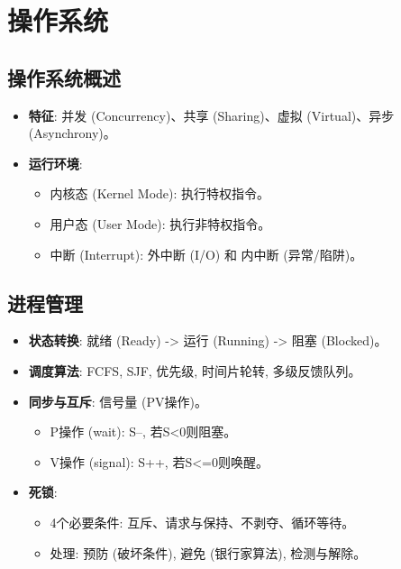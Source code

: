 \documentclass[cn,hazy,blue,12pt,screen,normal]{elegantnote}
\begin{document}
\section{操作系统}

\subsection{操作系统概述}
\begin{itemize}
    \item \textbf{特征}: 并发 (Concurrency)、共享 (Sharing)、虚拟 (Virtual)、异步 (Asynchrony)。
    \item \textbf{运行环境}:
    \begin{itemize}
        \item 内核态 (Kernel Mode): 执行特权指令。
        \item 用户态 (User Mode): 执行非特权指令。
        \item 中断 (Interrupt): 外中断 (I/O) 和 内中断 (异常/陷阱)。
    \end{itemize}
\end{itemize}

\subsection{进程管理}
\begin{itemize}
    \item \textbf{状态转换}: 就绪 (Ready) -> 运行 (Running) -> 阻塞 (Blocked)。
    \item \textbf{调度算法}: FCFS, SJF, 优先级, 时间片轮转, 多级反馈队列。
    \item \textbf{同步与互斥}: 信号量 (PV操作)。
    \begin{itemize}
        \item P操作 (wait): S--, 若S<0则阻塞。
        \item V操作 (signal): S++, 若S<=0则唤醒。
    \end{itemize}
    \item \textbf{死锁}:
    \begin{itemize}
        \item 4个必要条件: 互斥、请求与保持、不剥夺、循环等待。
        \item 处理: 预防 (破坏条件), 避免 (银行家算法), 检测与解除。
    \end{itemize}
\end{itemize}
\end{document}
